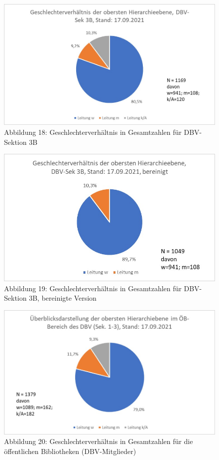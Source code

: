\documentclass[a4paper,
fontsize=11pt,
oneside,
numbers=noperiodatend,
parskip=half-,
bibliography=totoc,
final
]{scrartcl}
\begin{document}
\begin{figure}
\centering
\includegraphics{img/Abb_18_DBV-Sek3B_gesamt.jpg}
\caption{Abbildung 18: Geschlechterverhältnis in Gesamtzahlen für
DBV-Sektion 3B}
\end{figure}

\begin{figure}
\centering
\includegraphics{img/Abb_19_DBV-Sek3B_gesamt_bereinigt.jpg}
\caption{Abbildung 19: Geschlechterverhältnis in Gesamtzahlen für
DBV-Sektion 3B, bereinigte Version}
\end{figure}

\begin{figure}
\centering
\includegraphics{img/Abb_20_DBV-Sek1-3_gesamt.jpg}
\caption{Abbildung 20: Geschlechterverhältnis in Gesamtzahlen für die
öffentlichen Bibliotheken (DBV-Mitglieder)}
\end{figure}
\end{document}
